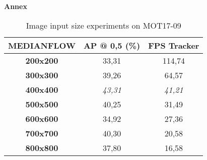 {}
\newpage
\appendix
\huge \textbf{Annex}
\\
\begin{table}[H]
\begin{center}
\begin{tabular}{|c|c|c|}
\hline
\textbf{MEDIANFLOW} & \textbf{AP @ 0,5 (\%)} & \textbf{FPS Tracker} \\ \hline
\textbf{200x200}    & 33,31                  & 114,74               \\ \hline
\textbf{300x300}    & 39,26                  & 64,57                \\ \hline
\textbf{400x400}    & \textit{43,31}         & \textit{41,21}       \\ \hline
\textbf{500x500}    & 40,25                  & 31,49                \\ \hline
\textbf{600x600}    & 34,92                  & 27,36                \\ \hline
\textbf{700x700}    & 40,30                  & 20,58                \\ \hline
\textbf{800x800}    & 37,80                  & 16,58                \\ \hline
\end{tabular}
\end{center}
\caption{Image input size experiments on MOT17-09}
\label{tab:annex_1}
\end{table}

